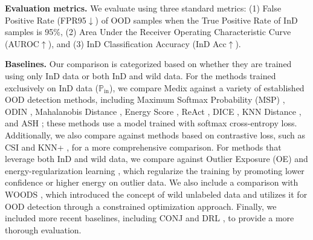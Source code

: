 \documentclass[10pt]{article} %
\theoremstyle{plain}
\theoremstyle{definition}
\begin{document}
\textbf{Evaluation metrics.}
We evaluate using three standard metrics: (1) False Positive Rate (FPR95$\downarrow$) of OOD samples when the True Positive Rate of InD samples is 95\%, (2) Area Under the Receiver Operating Characteristic Curve (AUROC$\uparrow$), and (3) InD Classification Accuracy (InD Acc$\uparrow$).


\textbf{Baselines.}
Our comparison is categorized based on whether they are trained using only InD data or both InD and wild data.
For the methods trained exclusively on InD data (\(\mathbb{P}_{\text{in}}\)), we compare Medix against a variety of established OOD detection methods, including Maximum Softmax Probability (MSP) \citep{hendrycks2017a}, ODIN \citep{liang2018enhancing}, Mahalanobis Distance \citep{lee2018simple}, Energy Score \citep{liu2020energy}, ReAct \citep{sun2021react}, DICE \citep{sun2022dice}, KNN Distance \citep{sun2022out}, and ASH \citep{djurisic2023extremely}; these methods use a model trained with softmax cross-entropy loss. Additionally, we also compare against methods based on contrastive loss, such as CSI \citep{tack2020csi} and KNN+ \citep{sun2022out}, for a more comprehensive comparison.
For methods that leverage both InD and wild data, we compare against Outlier Exposure (OE) \citep{hendrycks2018deep} and energy-regularization learning \citep{liu2020energy}, which regularize the training by promoting lower confidence or higher energy on outlier data. We also include a comparison with WOODS \citep{pmlr-v162-katz-samuels22a}, which introduced the concept of wild unlabeled data and utilizes it for OOD detection through a constrained optimization approach. Finally, we included more recent baselines, including CONJ \citep{peng2024conjnorm} and DRL \citep{zhang2024learning}, to provide a more thorough evaluation.

\end{document}

